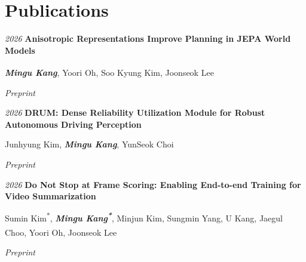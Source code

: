 \section{Publications}

\begin{samepage}
    \begin{publicationentry}{\textit{2026}}
        \textbf{Anisotropic Representations Improve Planning in JEPA World Models}
        \par\vspace{0.04cm}
        {\footnotesize \textbf{\textit{Mingu Kang}}, Yoori Oh\textsuperscript{\dag}, Soo Kyung Kim\textsuperscript{\dag}, Joonseok Lee\textsuperscript{\dag}}
    \end{publicationentry}
    \vspace{-0.05cm}
    \begin{onecolentry}
        \textit{Preprint}
    \end{onecolentry}
\end{samepage}

\vspace{0.06cm}

\begin{samepage}
    \begin{publicationentry}{\textit{2026}}
        \textbf{DRUM: Dense Reliability Utilization Module for Robust Autonomous Driving Perception}
        \par\vspace{0.04cm}
        {\footnotesize Junhyung Kim, \textbf{\textit{Mingu Kang}}, YunSeok Choi}
    \end{publicationentry}
    \vspace{-0.05cm}
    \begin{onecolentry}
        \textit{Preprint}
    \end{onecolentry}
\end{samepage}

\vspace{0.06cm}

\begin{samepage}
    \begin{publicationentry}{\textit{2026}}
        \textbf{Do Not Stop at Frame Scoring: Enabling End-to-end Training for Video Summarization}
        \par\vspace{0.04cm}
        {\footnotesize Sumin Kim\textsuperscript{*}, \textbf{\textit{Mingu Kang\textsuperscript{*}}}, Minjun Kim, Sungmin Yang, U Kang, Jaegul Choo\textsuperscript{\dag}, Yoori Oh\textsuperscript{\dag}, Joonseok Lee\textsuperscript{\dag}}
    \end{publicationentry}
    \vspace{-0.05cm}
    \begin{onecolentry}
        \textit{Preprint}
    \end{onecolentry}
\end{samepage}

